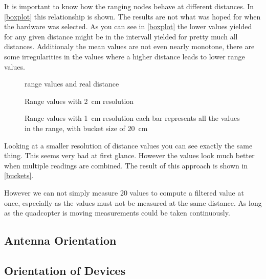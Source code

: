 It is important to know how the ranging nodes behave at different distances.
In \autoref{boxplot} this relationship is shown.
The results are not what was hoped for when the hardware was selected.
As you can see in \autoref{boxplot} the lower values yielded for any given distance might be in the intervall yielded for pretty much all distances.
Additionaly the mean values are not even nearly monotone, there are some irregularities in the values where a higher distance leads to lower range values.
\begin{landscape}
	\begin{figure}[h]
		\centering
		
		\caption{range values and real distance}
		\label{boxplot}
	\end{figure}

	\begin{figure}[h]
		\centering
		
		\caption{Range values with \SI{2}{\centi\metre} resolution}
		\label{resoulution}
	\end{figure}

	\begin{figure}[h]
		\centering
		
		\caption{Range values with \SI{1}{\centi\metre} resolution each bar represents all the values in the range, with bucket size of \SI{20}{\centi\metre}}
		\label{buckets}
	\end{figure}
\end{landscape}

Looking at a smaller resolution of distance values you can see exactly the same thing.
This seems very bad at first glance.
However the values look much better when multiple readings are combined.
The result of this approach is shown in \autoref{buckets}.

However we can not simply measure 20 values to compute a filtered value at once, especially as the values must not be measured at the same distance.
As long as the quadcopter is moving measurements could be taken continuously.

\subsection{Antenna Orientation}



\subsection{Orientation of Devices}


